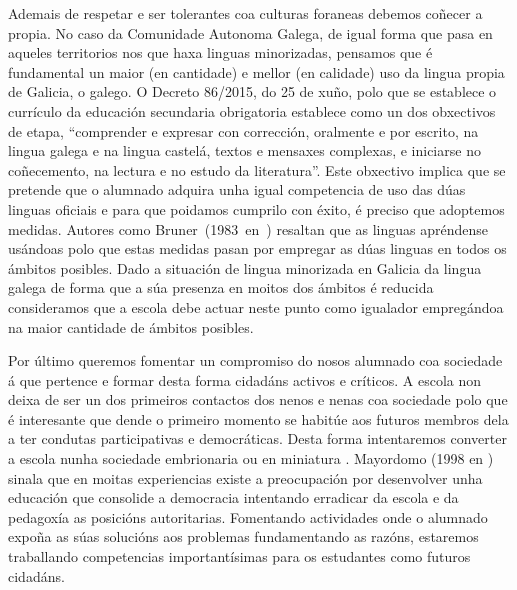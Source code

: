Ademais de respetar e ser tolerantes coa culturas foraneas debemos coñecer a propia. No caso da Comunidade Autonoma Galega, de igual forma que pasa en aqueles territorios nos que haxa linguas minorizadas, pensamos que é fundamental un maior (en cantidade) e mellor (en calidade) uso da lingua propia de Galicia, o galego. O  Decreto 86/2015, do 25 de xuño, polo que se establece o currículo da educación secundaria obrigatoria establece como un dos obxectivos de etapa, ``comprender e expresar con corrección, oralmente e por escrito, na lingua galega e na lingua castelá, textos e mensaxes complexas, e iniciarse no coñecemento, na lectura e no estudo da literatura''. Este obxectivo implica que se pretende que o alumnado adquira unha igual competencia de uso das dúas linguas oficiais e para que poidamos cumprilo con éxito, é preciso que adoptemos medidas. Autores como Bruner~(1983~en~) resaltan que as linguas apréndense usándoas polo que estas medidas pasan por empregar as dúas linguas en todos os ámbitos posibles. Dado a situación de lingua minorizada en Galicia da lingua galega de forma que a súa presenza en moitos dos ámbitos é reducida consideramos que a escola debe actuar neste punto como igualador empregándoa na maior cantidade de ámbitos posibles.

Por último queremos fomentar un compromiso do nosos alumnado coa sociedade á que pertence e formar desta forma cidadáns activos e críticos. A escola non deixa de ser un dos primeiros contactos dos nenos e nenas coa sociedade polo que é interesante que dende o primeiro momento se habitúe aos futuros membros dela a ter condutas participativas e democráticas. Desta forma intentaremos converter a escola nunha sociedade embrionaria ou en miniatura \cite{diazrelaciones}. Mayordomo (1998 en ) sinala que en moitas experiencias existe a preocupación por desenvolver unha educación que consolide a democracia intentando erradicar da escola e da pedagoxía as posicións autoritarias. Fomentando actividades onde o alumnado expoña as súas solucións aos problemas fundamentando as razóns, estaremos traballando competencias importantísimas para os estudantes como futuros cidadáns.
